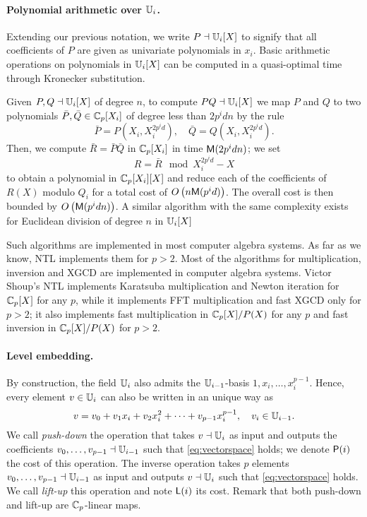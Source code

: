 \paragraph{Polynomial arithmetic over $\mathbb{U}_i$.}
Extending our previous notation, we write $P \dashv \mathbb{U}_i[X]$ to signify
that all coefficients of $P$ are given as univariate polynomials in
$x_i$. Basic arithmetic operations on polynomials in $\mathbb{U}_i[X]$ can be
computed in a quasi-optimal time through Kronecker substitution. \cite{}

Given $P,Q \dashv \mathbb{U}_i[X]$ of degree $n$, to compute $P Q \dashv \mathbb{U}_i[X]$ we map $P$ and
$Q$ to two polynomials $\bar{P},\bar{Q}\in\mathbb{C}_p[X_i]$ of degree less
than $2p^idn$ by the rule
\[\bar{P} = P(X_i,X_i^{2p^id}),\quad  \bar{Q} = Q(X_i,X_i^{2p^id}).\]
Then, we compute $\bar{R}=\bar{P}\bar{Q}$ in $\mathbb{C}_p[X_i]$ in time
$\mathrm{\sf M}(2p^idn)$; we set
\[R = \bar{R} \mod X_i^{2p^id} - X\]
to obtain a polynomial in $\mathbb{C}_p[X_i][X]$ and reduce each of the
coefficients of $R(X)$ modulo $Q_i$ for a total cost of
$O\left(n\mathrm{\sf M}(p^id)\right)$. The overall cost is then bounded by
$O\left(\mathrm{\sf M}(p^idn)\right)$. A similar algorithm with the same
complexity exists for Euclidean division of degree $n$ in $\mathbb{U}_i[X]$


Such algorithms are implemented in most computer algebra systems. As
far as we know, NTL implements them for $p > 2$.
Most of the algorithms for multiplication, inversion and XGCD are
implemented in computer algebra systems. Victor Shoup's NTL implements
Karatsuba multiplication and Newton iteration for $\mathbb{C}_p[X]$ for any
$p$, while it implements FFT multiplication and fast XGCD only for $p
> 2$; it also implements fast multiplication in $\mathbb{C}_p[X]/P(X)$ for any
$p$ and fast inversion in $\mathbb{C}_p[X]/P(X)$ for $p>2$.

\paragraph{Level embedding.}
By construction, the field $\mathbb{U}_i$ also admits the $\mathbb{U}_{i-1}$-basis
$1,x_i,\dots,x_i^{p-1}$. Hence, every element $v\in\mathbb{U}_i$ can also be
written in an unique way as
\begin{equation}
  \label{eq:vectorspace}
  v = v_0 + v_1 x_i + v_2 x_i^2 + \cdots + v_{p-1} x_i^{p-1}, \quad v_i \in \mathbb{U}_{i-1}.
\end{equation}
We call \emph{push-down} the operation that takes $v\dashv\mathbb{U}_i$ as input
and outputs the coefficients $v_0,\ldots,v_{p-1}\dashv\mathbb{U}_{i-1}$ such
that \eqref{eq:vectorspace} holds; we denote $\mathrm{\sf P}(i)$ the cost of
this operation. The inverse operation takes $p$ elements
$v_0,\ldots,v_{p-1}\dashv\mathbb{U}_{i-1}$ as input and outputs $v\dashv\mathbb{U}_i$ such
that \eqref{eq:vectorspace} holds. We call \emph{lift-up} this
operation and note $\mathrm{\sf L}(i)$ its cost.  Remark that both
push-down and lift-up are $\mathbb{C}_p$-linear maps.


